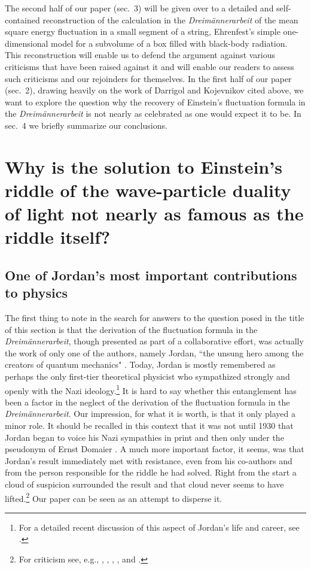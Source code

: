\documentclass[12pt]{elsart}
\begin{document}
The second half of our paper (sec.\ 3) will be given over to a detailed and self-contained reconstruction of the calculation in the {\it Dreim\"annerarbeit}  of the mean square energy fluctuation in a small segment of a string, Ehrenfest's simple one-dimensional model for a subvolume of a box filled with black-body radiation. This reconstruction will enable us to defend the argument against various criticisms that have been raised against it and will enable our readers to assess such criticisms and our rejoinders for themselves. 
In the first half of our paper (sec.\ 2), drawing heavily on the work of Darrigol and Kojevnikov cited above, we want to explore the question why the recovery of Einstein's fluctuation formula in the {\it Dreim\"annerarbeit} is not nearly as celebrated as one would expect it to be. In sec.\ 4 we briefly summarize our conclusions. 

\section{Why is the solution to Einstein's riddle of the wave-particle duality of light not nearly as famous as the riddle itself?}  

\subsection{One of Jordan's most important contributions to physics}

The first thing to note in the search for answers to the question posed in the title of this section is  
that the derivation of the fluctuation formula in the {\it Dreim\"annerarbeit}, though presented as part of a collaborative effort, was actually the work of only one of the authors, namely Jordan, ``the unsung hero among the creators of quantum mechanics" \citep[p.\ 5]{Schweber 1994}. Today, Jordan is mostly remembered as perhaps the only first-tier theoretical physicist  who sympathized strongly and openly with the Nazi ideology.\footnote{\label{nazi}For a detailed recent discussion of this aspect of Jordan's life and career, see \citep{Hoffmann and Walker 2007}.} It is hard to say whether this entanglement has been a factor in the neglect of the derivation of the fluctuation formula in the {\it Dreim\"annerarbeit}.
Our impression, for what it is worth, is that it only played a minor role.
It should be recalled in this context that it was not until 1930 that Jordan began to voice his Nazi sympathies in print and then only under the pseudonym of Ernst Domaier \citep[p.\ 71]{Beyler 2007}. A much more important factor, it seems, was that Jordan's result immediately met with resistance, even from his co-authors and from the person responsible for the riddle he had solved. 
Right from the start a cloud of  suspicion surrounded the result and that cloud never seems to have lifted.\footnote{For criticism see, e.g., \citep{Smekal 1926}, \citep{Heisenberg 1931}, \citep{Born and Fuchs 1939a}, \citep{Gonzalez and Wergeland 1973}, and \citep{Bach 1989}.}  Our paper can be seen as an attempt to disperse it.
\end{document}
